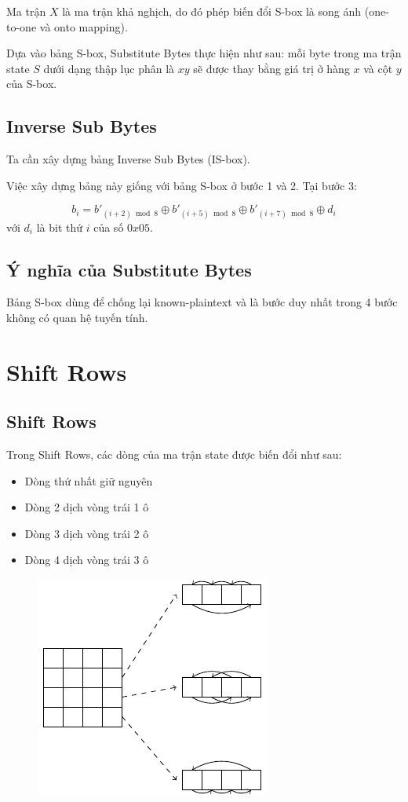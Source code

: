 Ma trận $X$ là ma trận khả nghịch, do đó phép biến đổi S-box là song ánh (one-to-one và onto mapping).

Dựa vào bảng S-box, Substitute Bytes thực hiện như sau: mỗi byte trong ma trận state $S$ dưới dạng thập lục phân là $xy$ sẽ được thay bằng giá trị ở hàng $x$ và cột $y$ của S-box.

\subsection{Inverse Sub Bytes}

Ta cần xây dựng bảng Inverse Sub Bytes (IS-box).

Việc xây dựng bảng này giống với bảng S-box ở bước 1 và 2. Tại bước 3:

\[ b_i = b'_{(i+2) \bmod 8} \oplus b'_{(i+5) \bmod 8} \oplus b'_{(i+7) \bmod 8} \oplus d_i \]
với $d_i$ là bit thứ $i$ của số $0x05$.

\subsection{Ý nghĩa của Substitute Bytes}

Bảng S-box dùng để chống lại known-plaintext và là bước duy nhất trong 4 bước không có quan hệ tuyến tính.

\section{Shift Rows}

\subsection{Shift Rows}

Trong Shift Rows, các dòng của ma trận state được biến đổi như sau:

\begin{itemize}
    \item Dòng thứ nhất giữ nguyên
    \item Dòng 2 dịch vòng trái 1 ô
    \item Dòng 3 dịch vòng trái 2 ô
    \item Dòng 4 dịch vòng trái 3 ô
\end{itemize}

\begin{figure}[ht]
    \centering
    \includegraphics{AES/shiftrows.pdf}
\end{figure}

